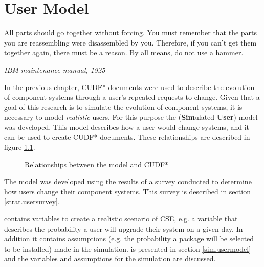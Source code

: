 \chapter{User Model}
\label{simulation}
\epigraph{All parts should go together without forcing. You must remember that the parts you are reassembling were disassembled by you. 
Therefore, if you can't get them together again, there must be a reason. By all means, do not use a hammer.}
{\textit{IBM maintenance manual, 1925}}

In the previous chapter, CUDF* documents were used to describe the evolution of component systems through a user's repeated requests to change.
Given that a goal of this research is to simulate the evolution of component systems,
it is necessary to model \textit{realistic} users. 
For this purpose the \usermodel (\textbf{Sim}ulated \textbf{User}) model was developed.
This model describes how a user would change systems,
and it can be used to create CUDF* documents.
These relationships are described in figure \ref{sim.modeldiagram}.

\begin{figure}[htp]
\begin{center}
  \caption{Relationships between the \usermodel model and CUDF*}
  \label{sim.modeldiagram}
\end{center}
\end{figure}

The \usermodel model was developed using the results of a survey conducted to determine how users change their component systems.
This survey is described in section \ref{strat.usersurvey}.

\usermodel contains variables to create a realistic scenario of CSE, e.g. a variable that describes the probability a user will upgrade their system on a given day.
In addition it contains assumptions (e.g. the probability a package will be selected to be installed) made in the simulation.
\usermodel is presented in section \ref{sim.usermodel} and the variables and assumptions for the simulation are discussed.

